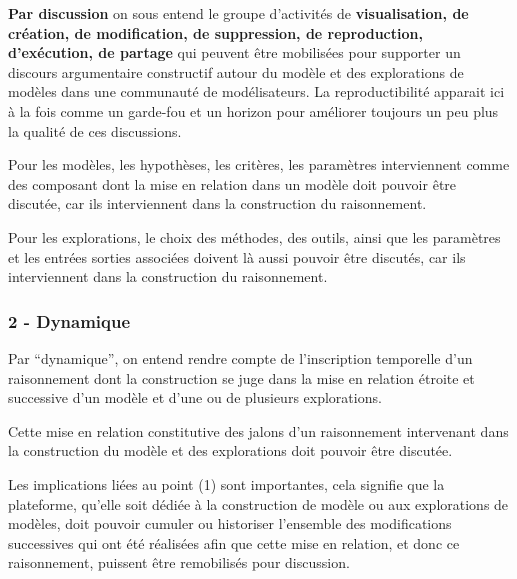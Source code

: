 \textbf{Par discussion} on sous entend le groupe d'activités de \textbf{visualisation, de création, de modification, de suppression, de reproduction, d'exécution, de partage} qui peuvent être mobilisées pour supporter un discours argumentaire constructif autour du modèle et des explorations de modèles dans une communauté de modélisateurs. La reproductibilité apparait ici à la fois comme un garde-fou et un horizon pour améliorer toujours un peu plus la qualité de ces discussions. 

Pour les modèles, les hypothèses, les critères, les paramètres interviennent comme des composant dont la mise en relation dans un modèle doit pouvoir être discutée, car ils interviennent dans la construction du raisonnement.

Pour les explorations, le choix des méthodes, des outils, ainsi que les paramètres et les entrées sorties associées doivent là aussi pouvoir être discutés, car ils interviennent dans la construction du raisonnement.



\subsubsection{2 - Dynamique}

Par \enquote{dynamique}, on entend rendre compte de l'inscription temporelle d'un raisonnement dont la construction se juge dans la mise en relation étroite et successive d'un modèle et d'une ou de plusieurs explorations. 

Cette mise en relation constitutive des jalons d'un raisonnement intervenant dans la construction du modèle et des explorations doit pouvoir être discutée.

Les implications liées au point (1) sont importantes, cela signifie que la plateforme, qu'elle soit dédiée à la construction de modèle ou aux explorations de modèles, doit pouvoir cumuler ou historiser l'ensemble des modifications successives qui ont été réalisées afin que cette mise en relation, et donc ce raisonnement, puissent être remobilisés pour discussion.

